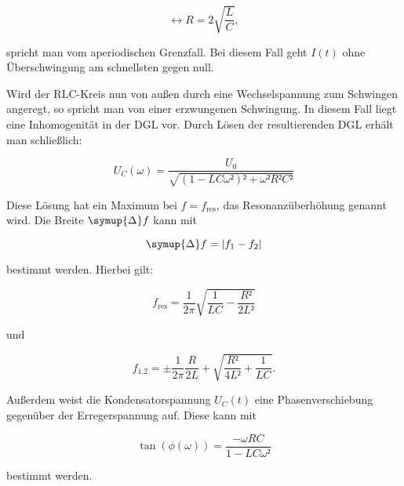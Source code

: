 \begin{equation}
\leftrightarrow R = 2\sqrt{\frac{L}{C}},
\label{eqn:apth}
\end{equation}

spricht man vom aperiodischen Grenzfall. Bei diesem Fall geht $I(t)$ ohne 
Überschwingung am schnellsten gegen null. 

Wird der RLC-Kreis nun von außen durch eine Wechselspannung zum Schwingen 
angeregt, so spricht man von einer erzwungenen Schwingung. In diesem Fall
liegt eine Inhomogenität in der DGL vor. Durch Lösen der resultierenden 
DGL erhält man schließlich: 

\begin{equation}
U_C(\omega) = \frac{U_0}{\sqrt{(1-LC\omega²)²+\omega²R²C²}}
\end{equation}

Diese Lösung hat ein Maximum bei $f = f_\text{res}$, das Resonanzüberhöhung
genannt wird. Die Breite $\symup{\Delta}f$ kann mit

\begin{equation}
\symup{\Delta} f = |f_1 - f_2|
\end{equation}

bestimmt werden. Hierbei gilt: 

\begin{equation}
f_\text{res} = \frac{1}{2\pi}\sqrt{\frac{1}{LC}-\frac{R²}{2L²}}
\label{eqn:fres}
\end{equation}

und 

\begin{equation}
f_\text{1,2} = \pm \frac{1}{2\pi} \frac{R}{2L}+\sqrt{\frac{R²}{4L²}+\frac{1}{LC}}.
\label{eqn:f12}
\end{equation}

Außerdem weist die Kondensatorspannung $U_C(t)$ eine Phasenverschiebung gegenüber
der Erregerspannung auf. Diese kann mit 

\begin{equation}
\tan({\phi(\omega)})=\frac{-\omega RC}{1-LC\omega²}
\end{equation}

bestimmt werden. 
